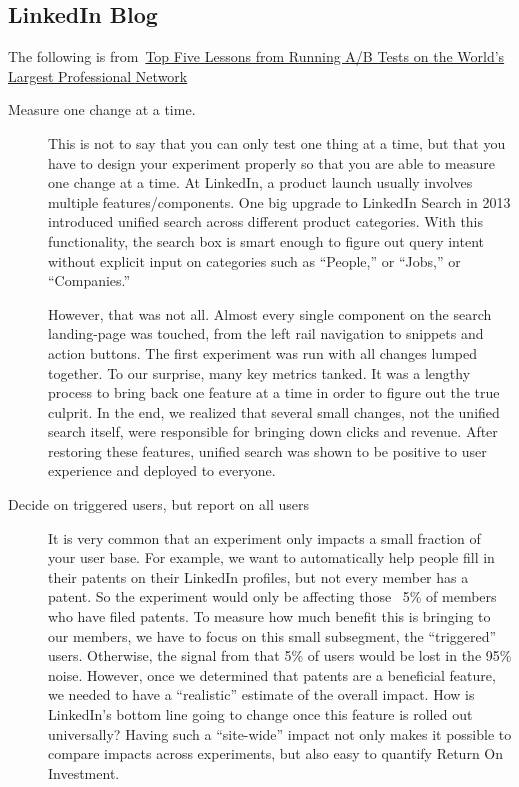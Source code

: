 \subsection{LinkedIn Blog}
The following is from~\href{https://www.linkedin.com/blog/engineering/archive/top-five-lessons-from-running-a-b-tests-on-the-world-s-largest-p}{Top Five Lessons from Running A/B Tests on the World's Largest Professional Network}
\begin{description}

\item [Measure one change at a time.]

This is not to say that you can only test one thing at a time, but that you have to design your experiment properly so that you are able to measure one change at a time. At LinkedIn, a product launch usually involves multiple features/components. One big upgrade to LinkedIn Search in 2013 introduced unified search across different product categories. With this functionality, the search box is smart enough to figure out query intent without explicit input on categories such as ``People,'' or ``Jobs,'' or ``Companies.''

However, that was not all. Almost every single component on the search landing-page was touched, from the left rail navigation to snippets and action buttons. The first experiment was run with all changes lumped together. To our surprise, many key metrics tanked. It was a lengthy process to bring back one feature at a time in order to figure out the true culprit. In the end, we realized that several small changes, not the unified search itself, were responsible for bringing down clicks and revenue. After restoring these features, unified search was shown to be positive to user experience and deployed to everyone.  

\item [Decide on triggered users, but report on all users]
It is very common that an experiment only impacts a small fraction of your user base. 
For example, we want to automatically help people fill in their patents on their LinkedIn profiles, but not every member has a patent. So the experiment would only be affecting those ~5\% of members who have filed patents.
To measure how much benefit this is bringing to our members, we have to focus on this small subsegment, the ``triggered'' users. 
Otherwise, the signal from that 5\% of users would be lost in the 95\% noise.
However, once we determined that patents are a beneficial feature, we needed to have a ``realistic'' estimate of the overall impact. How is LinkedIn’s bottom line going to change once this feature is rolled out universally? 
Having such a ``site-wide'' impact not only makes it possible to compare impacts across experiments, but also easy to quantify Return On Investment.


\end{description}
